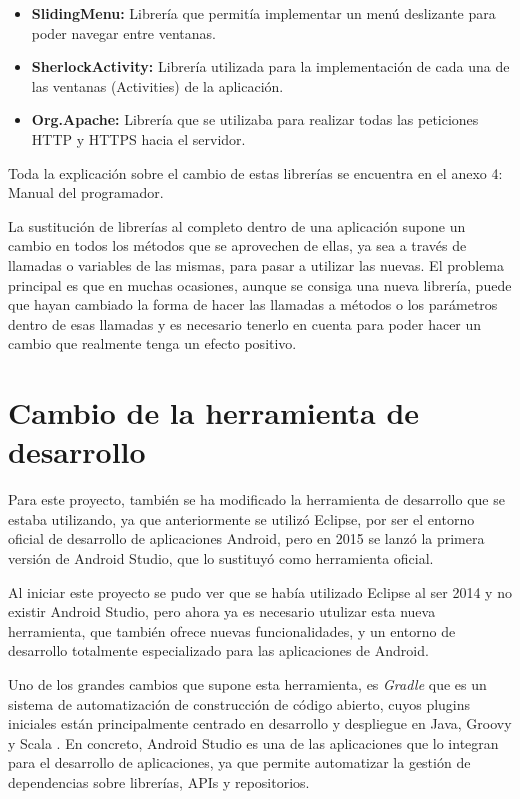 \begin{itemize}
\item \textbf{SlidingMenu:} Librería que permitía implementar un menú deslizante para poder navegar entre ventanas.
\item \textbf{SherlockActivity:} Librería utilizada para la implementación de cada una de las ventanas (Activities) de la aplicación.
\item \textbf{Org.Apache:} Librería que se utilizaba para realizar todas las peticiones HTTP y HTTPS hacia el servidor.
\end{itemize}

Toda la explicación sobre el cambio de estas librerías se encuentra en el anexo 4: Manual del programador.

La sustitución de librerías al completo dentro de una aplicación supone un cambio en todos los métodos que se aprovechen de ellas, ya sea a través de llamadas o variables de las mismas, para pasar a utilizar las nuevas. El problema principal es que en muchas ocasiones, aunque se consiga una nueva librería, puede que hayan cambiado la forma de hacer las llamadas a métodos o los parámetros dentro de esas llamadas y es necesario tenerlo en cuenta para poder hacer un cambio que realmente tenga un efecto positivo.

\section{Cambio de la herramienta de desarrollo}

Para este proyecto, también se ha modificado la herramienta de desarrollo que se estaba utilizando, ya que anteriormente se utilizó Eclipse, por ser el entorno oficial de desarrollo de aplicaciones Android, pero en 2015 se lanzó la primera versión de Android Studio, que lo sustituyó como herramienta oficial.

Al iniciar este proyecto se pudo ver que se había utilizado Eclipse al ser 2014 y no existir Android Studio, pero ahora ya es necesario utulizar esta nueva herramienta, que también ofrece nuevas funcionalidades, y un entorno de desarrollo totalmente especializado para las aplicaciones de Android. 

Uno de los grandes cambios que supone esta herramienta, es \textit{Gradle} \cite{gradle2} que es un sistema de automatización de construcción de código abierto, cuyos plugins iniciales están principalmente centrado en desarrollo y despliegue en Java, Groovy y Scala \cite{gradle1}. En concreto, Android Studio es una de las aplicaciones que lo integran para el desarrollo de aplicaciones, ya que permite automatizar la gestión de dependencias sobre librerías, APIs y repositorios.

